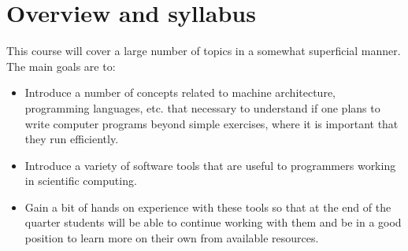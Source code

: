\documentclass[letterpaper,10pt,english]{sphinxmanual}
\begin{document}
\section{Overview and syllabus}
\label{outline::doc}\label{outline:outline}\label{outline:overview-and-syllabus}
This course will cover a large number of topics in a somewhat superficial
manner.  The main goals are to:
\begin{itemize}
\item {} 
Introduce a number of concepts related to machine architecture,
programming languages, etc. that necessary to understand if one plans to
write computer programs beyond simple exercises, where it is important
that they run efficiently.

\item {} 
Introduce a variety of software tools that are useful to programmers
working in scientific computing.

\item {} 
Gain a bit of hands on experience with these tools so that at the end
of the quarter students will be able to continue working with them and
be in a good position to learn more on their own from available
resources.

\end{itemize}
\end{document}
